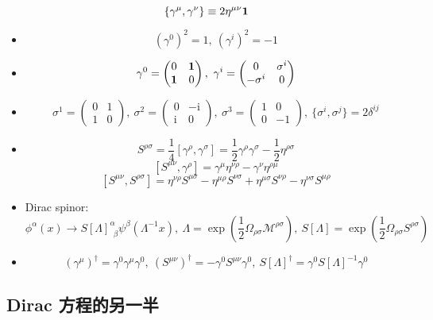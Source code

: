 \documentclass{article}
\begin{document}
$$
  \{\gamma^{\mu},\gamma^{\nu}\}\equiv2\eta^{\mu\nu}\bf{1}
$$

\begin{itemize}
  \item $$(\gamma^0)^2=1,\ (\gamma^i)^2=-1$$
  \item $$
          \gamma^0=\begin{pmatrix}
            0 & \bf{1} \\ \bf{1} & 0
          \end{pmatrix},\ \gamma^i=\begin{pmatrix}
            0 & \sigma^i \\ -\sigma^i & 0
          \end{pmatrix}
        $$
  \item $$
          \sigma^1=\begin{pmatrix}
            0 & 1 \\ 1 & 0
          \end{pmatrix},\ \sigma^2=\begin{pmatrix}
            0 & -\mathrm{i} \\ \mathrm{i} & 0
          \end{pmatrix},\ \sigma^3=\begin{pmatrix}
            1 & 0 \\ 0 & -1
          \end{pmatrix},\ \{\sigma^i,\sigma^j\}=2\delta^{ij}
        $$
  \item $$S^{\rho\sigma}=\frac{1}{4}[\gamma^{\rho},\gamma^{\sigma}]=\frac{1}{2}\gamma^{\rho}\gamma^{\sigma}-\frac{1}{2}\eta^{\rho\sigma}$$ $$[S^{\mu\nu},\gamma^{\rho}]=\gamma^{\mu}\eta^{\nu\rho}-\gamma^{\nu}\eta^{\rho\mu}$$ $$[S^{\mu\nu},S^{\rho\sigma}]=\eta^{\nu\rho}S^{\mu\sigma}-\eta^{\mu\rho}S^{\nu\sigma}+\eta^{\mu\sigma}S^{\nu\rho}-\eta^{\nu\sigma}S^{\mu\rho}$$
  \item Dirac spinor: $$\phi^\alpha(x)\to S[\Lambda]^{\alpha}_{\ \ \beta}\psi^{\beta}(\Lambda^{-1}x),\ \Lambda=\exp\left(\frac{1}{2}\Omega_{\rho\sigma}\mathcal{M}^{\rho\sigma}\right),\ S[\Lambda]=\exp\left(\frac{1}{2}\Omega_{\rho\sigma}S^{\rho\sigma}\right)$$
  \item $$\left(\gamma^{\mu}\right)^{\dagger}=\gamma^0\gamma^\mu\gamma^0,\ \left(S^{\mu\nu}\right)^{\dagger}=-\gamma^0S^{\mu\nu}\gamma^0,\ S[\Lambda]^{\dagger}=\gamma^0S[\Lambda]^{-1}\gamma^0$$
\end{itemize}

\subsection{Dirac 方程的另一半}
\end{document}
